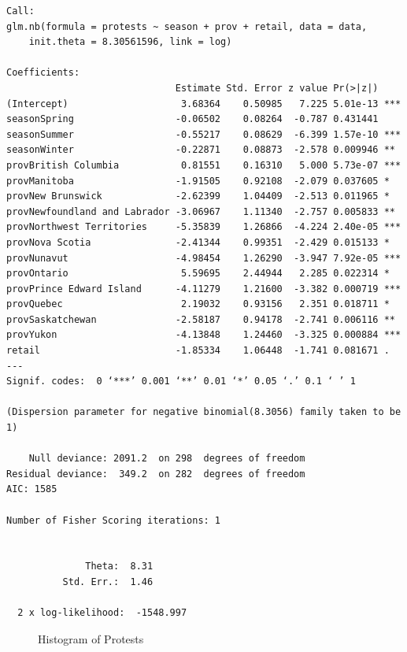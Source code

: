 \documentclass[12pt]{article}
\begin{document}
\begin{verbatim}
Call:
glm.nb(formula = protests ~ season + prov + retail, data = data, 
    init.theta = 8.30561596, link = log)

Coefficients:
                              Estimate Std. Error z value Pr(>|z|)    
(Intercept)                    3.68364    0.50985   7.225 5.01e-13 ***
seasonSpring                  -0.06502    0.08264  -0.787 0.431441    
seasonSummer                  -0.55217    0.08629  -6.399 1.57e-10 ***
seasonWinter                  -0.22871    0.08873  -2.578 0.009946 ** 
provBritish Columbia           0.81551    0.16310   5.000 5.73e-07 ***
provManitoba                  -1.91505    0.92108  -2.079 0.037605 *  
provNew Brunswick             -2.62399    1.04409  -2.513 0.011965 *  
provNewfoundland and Labrador -3.06967    1.11340  -2.757 0.005833 ** 
provNorthwest Territories     -5.35839    1.26866  -4.224 2.40e-05 ***
provNova Scotia               -2.41344    0.99351  -2.429 0.015133 *  
provNunavut                   -4.98454    1.26290  -3.947 7.92e-05 ***
provOntario                    5.59695    2.44944   2.285 0.022314 *  
provPrince Edward Island      -4.11279    1.21600  -3.382 0.000719 ***
provQuebec                     2.19032    0.93156   2.351 0.018711 *  
provSaskatchewan              -2.58187    0.94178  -2.741 0.006116 ** 
provYukon                     -4.13848    1.24460  -3.325 0.000884 ***
retail                        -1.85334    1.06448  -1.741 0.081671 .  
---
Signif. codes:  0 ‘***’ 0.001 ‘**’ 0.01 ‘*’ 0.05 ‘.’ 0.1 ‘ ’ 1

(Dispersion parameter for negative binomial(8.3056) family taken to be 1)

    Null deviance: 2091.2  on 298  degrees of freedom
Residual deviance:  349.2  on 282  degrees of freedom
AIC: 1585

Number of Fisher Scoring iterations: 1


              Theta:  8.31 
          Std. Err.:  1.46 

  2 x log-likelihood:  -1548.997 
\end{verbatim}


\begin{figure}[h!]
  \centering
  \caption{Histogram of Protests}
  \label{fig:your_label}
\end{figure}
\end{document}

